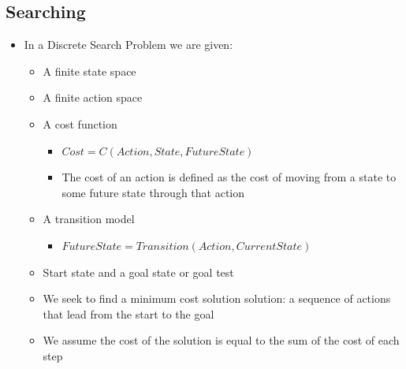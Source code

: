 \documentclass[11pt]{article}
\begin{document}
\subsection{Searching}
\label{sec:org5e3dee1}
\begin{itemize}
\item In a Discrete Search Problem we are given:
\begin{itemize}
\item A finite state space
\item A finite action space
\item A cost function
\begin{itemize}
\item \(Cost=C(Action, State, FutureState)\)
\item The cost of an action is defined as the cost of moving from a state to some future state through that action
\end{itemize}
\item A transition model
\begin{itemize}
\item \(FutureState=Transition(Action, CurrentState)\)
\end{itemize}
\item Start state and a goal state or goal test
\item We seek to find a minimum cost solution solution: a sequence of actions that lead from the start to the goal
\item We assume the cost of the solution is equal to the sum of the cost of each step
\end{itemize}
\end{itemize}
\end{document}
